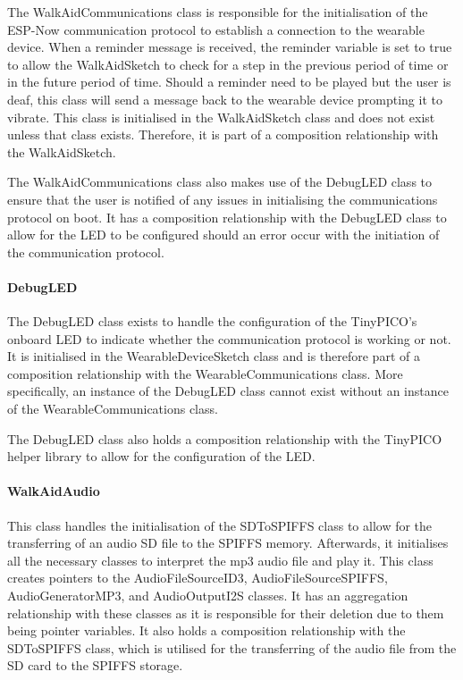                     The WalkAidCommunications class is responsible for the initialisation of the ESP-Now communication protocol to establish a connection to the wearable device. When a reminder message is received, the reminder variable is set to true to allow the WalkAidSketch to check for a step in the previous period of time or in the future period of time. Should a reminder need to be played but the user is deaf, this class will send a message back to the wearable device prompting it to vibrate. This class is initialised in the WalkAidSketch class and does not exist unless that class exists. Therefore, it is part of a composition relationship with the WalkAidSketch.

                    The WalkAidCommunications class also makes use of the DebugLED class to ensure that the user is notified of any issues in initialising the communications protocol on boot. It has a composition relationship with the DebugLED class to allow for the LED to be configured should an error occur with the initiation of the communication protocol.

                \paragraph{DebugLED}\mbox{}

                    The DebugLED class exists to handle the configuration of the TinyPICO's onboard LED to indicate whether the communication protocol is working or not. It is initialised in the WearableDeviceSketch class and is therefore part of a composition relationship with the WearableCommunications class. More specifically, an instance of the DebugLED class cannot exist without an instance of the WearableCommunications class.

                    The DebugLED class also holds a composition relationship with the TinyPICO helper library to allow for the configuration of the LED.

                \paragraph{WalkAidAudio}\mbox{}

                    This class handles the initialisation of the SDToSPIFFS class to allow for the transferring of an audio SD file to the SPIFFS memory. Afterwards, it initialises all the necessary classes to interpret the mp3 audio file and play it. This class creates pointers to the AudioFileSourceID3, AudioFileSourceSPIFFS, AudioGeneratorMP3, and AudioOutputI2S classes. It has an aggregation relationship with these classes as it is responsible for their deletion due to them being pointer variables. It also holds a composition relationship with the SDToSPIFFS class, which is utilised for the transferring of the audio file from the SD card to the SPIFFS storage. 

